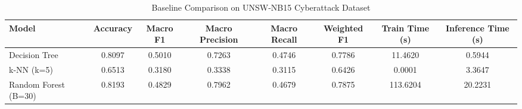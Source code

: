 \begin{table}[htbp]
\centering
\caption{Baseline Comparison on UNSW-NB15 Cyberattack Dataset}
\label{tab:baseline_comparison}
\begin{tabular}{lccccccc}
\toprule
Model & Accuracy & Macro F1 & Macro Precision & Macro Recall & Weighted F1 & Train Time (s) & Inference Time (s) \\
\midrule
Decision Tree & 0.8097 & 0.5010 & 0.7263 & 0.4746 & 0.7786 & 11.4620 & 0.5944 \\
k-NN (k=5) & 0.6513 & 0.3180 & 0.3338 & 0.3115 & 0.6426 & 0.0001 & 3.3647 \\
Random Forest (B=30) & 0.8193 & 0.4829 & 0.7962 & 0.4679 & 0.7875 & 113.6204 & 20.2231 \\
\bottomrule
\end{tabular}
\end{table}
